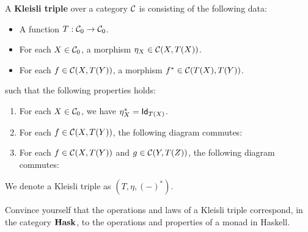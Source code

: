 \begin{dfn}\label{def:kleisli-triple}
  A \textbf{Kleisli triple} over a category $\CC$ is  consisting of the following data:
\begin{itemize}
\item A function $T: \Ob{\CC}\to \Ob{\CC}$.
\item For each $X\in\Ob{\CC}$, a morphism $\eta_X \in \CHom{\CC}{X}{T(X)}$.
\item For each $f\in\CHom{\CC}{X}{T(Y)}$, a morphism $f^{*} \in \CHom{\CC}{T(X)}{T(Y)}$.
\end{itemize}
such that the following properties holds:
\begin{enumerate}
\item For each $X \in \Ob\CC$, we have $\eta_X^{*} = \Id[T(X)]$.
\item For each $f\in\CHom{\CC}{X}{T(Y)}$, the following diagram commutes:
\begin{center}
\end{center}
\item For each $f\in\CHom{\CC}{X}{T(Y)}$ and $g\in\CHom{\CC}{Y}{T(Z)}$, the following diagram commutes:
\begin{center}
\end{center}
\end{enumerate}
We denote a Kleisli triple as $(T,\eta, (-)^{*})$.
\end{dfn}

\begin{exer}
  Convince yourself that the operations and laws of a Kleisli triple correspond, in the category $\HASK$, to the operations and properties of a monad in Haskell.
\end{exer}


